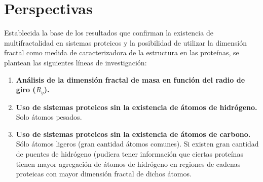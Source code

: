 \chapter*{Perspectivas}

Establecida la base de los resultados que confirman la existencia de multifractalidad en sistemas proteicos y la posibilidad de utilizar la dimensión fractal como medida de caracterizadora de  la estructura en las prote\'{i}nas, se plantean las siguientes líneas de investigación:

\begin{enumerate}
	\item \textbf{Análisis de la dimensión fractal de masa en función del radio de giro ($R_g$).} 
	\item \textbf{Uso de sistemas proteicos sin la existencia de átomos de hidrógeno.}
	Solo átomos pesados.
	\item \textbf{Uso de sistemas proteicos sin la existencia de átomos de carbono.}
	Sólo átomos ligeros (gran cantidad átomos comunes). Si existen gran cantidad de puentes de hidrógeno (pudiera tener información que ciertas proteínas tienen mayor agregación de átomos de hidrógeno en regiones de cadenas proteicas con mayor dimensión fractal de dichos átomos.
\end{enumerate}

